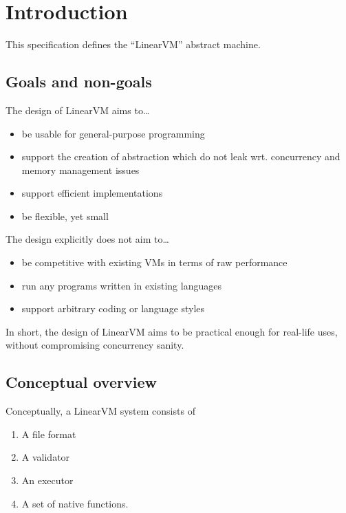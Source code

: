 \documentclass[a4paper]{report}
\begin{document}
\tableofcontents

\chapter{Introduction}
This specification defines the ``LinearVM'' abstract machine.

\section{Goals and non-goals}
The design of LinearVM aims to\ldots
\begin{itemize}
\item be usable for general-purpose programming

\item support the creation of abstraction which do not leak
  wrt. concurrency and memory management issues

\item support efficient implementations

\item be flexible, yet small
\end{itemize}

\noindent
The design explicitly does not aim to\ldots
\begin{itemize}
\item be competitive with existing VMs in terms of raw performance
\item run any programs written in existing languages
\item support arbitrary coding or language styles
\end{itemize}

In short, the design of LinearVM aims to be practical enough for
real-life uses, without compromising concurrency sanity. %


\section{Conceptual overview}
Conceptually, a LinearVM system consists of
\begin{enumerate}
\item A file format
\item A validator
\item An executor
\item A set of native functions.
\end{enumerate}
\end{document}
